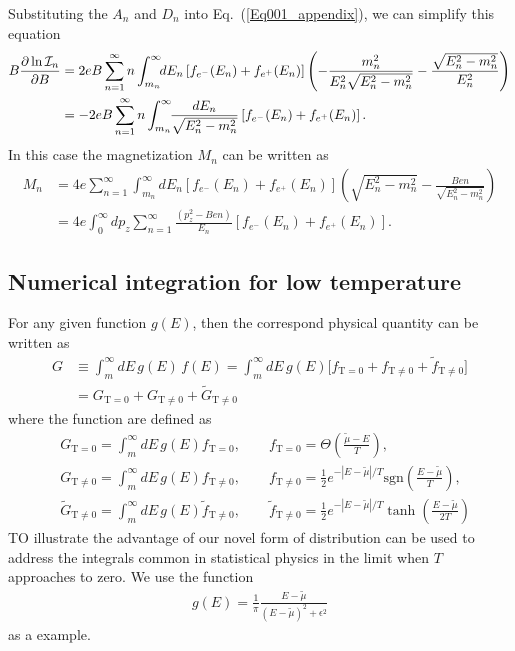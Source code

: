 \documentclass[sn-mathphys,Numbered]{sn-jnl}
\begin{document}
Substituting the $A_n$ and $D_n$ into Eq.~(\ref{Eq001_appendix}), we can simplify this equation 
\begin{align}
B\frac{\partial\ln\mathcal{I}_n}{\partial B}
&=2eB\sum_{n=1}^\infty n\int_{m_n}^\infty\!\!dE_n \left[f_{e^-}(E_n)+f_{e^+}(E_n)\right]\left(-\frac{m^2_n}{E^2_{n}\sqrt{E^2_n-m^2_n}}-\frac{\sqrt{E^2_n-m^2_n}}{E^2_{n}}\right)\notag\\
&=-2eB\sum_{n=1}^\infty n\int_{m_n}^\infty\!\!\frac{dE_n}{\sqrt{E^2_n-m^2_n}} \left[f_{e^-}(E_n)+f_{e^+}(E_n)\right].
\end{align}
In this case the magnetization $M_n$ can be written as
\begin{align}
M_n&=4e\sum_{n=1}^\infty \int_{m_n}^\infty\!\!dE_n\left[f_{e^-}(E_n)+f_{e^+}(E_n)\right]\left({\sqrt{E^2_n-m^2_n}}-\frac{Ben}{\sqrt{E^2_n-m^2_n}}\right)\\
&=4e \int_{0}^\infty\!\!dp_z\sum_{n=1}^\infty\frac{(p_z^2-Ben)}{E_n}\left[f_{e^-}(E_n)+f_{e^+}(E_n)\right].
\end{align}

\subsection{Numerical integration for low temperature}
For any given function $g(E)$, then the correspond physical quantity can be written as
\begin{align}
G&\equiv\int^{\infty}_{m}dE\,g(E)\,f(E)=\int^{\infty}_{m}dE\,g(E)\bigg[f_{\mathrm{T=0}}+f_\mathrm{T\neq0}+\tilde f_\mathrm{T\neq0}\bigg]\\
&=G_{\mathrm{T=0}}+G_\mathrm{T\neq0}+\tilde G_\mathrm{T\neq0}
\end{align}
where the function are defined as
\begin{align}
&G_{\mathrm{T=0}}=\int^{\infty}_{m}dE\,g(E)f_{\mathrm{T=0}},\qquad f_{\mathrm{T=0}}=\Theta\left(\frac{\widetilde\mu - E}{T}\right),\\ &G_{\mathrm{T\neq0}}=\int^{\infty}_{m}dE\,g(E)f_{\mathrm{T\neq0}},\qquad f_\mathrm{T\neq0}=\frac{1}{2}e^{ - |E-\widetilde\mu|/T }\mathrm{sgn}\left(\frac{E-\widetilde\mu}{T}\right),\\
&\tilde G_{\mathrm{T\neq0}}=\int^{\infty}_{m}dE\,g(E)\tilde f_{\mathrm{T\neq0}},\qquad\tilde f_\mathrm{T\neq0}=\frac{1}{2}e^{ - |E-\widetilde\mu|/T }\tanh\left(\frac{E-\widetilde\mu}{2T}\right)
\end{align}
TO illustrate the advantage of our novel form of distribution can be used to address the integrals common in statistical physics in the limit when $T$ approaches to zero. We use the function 
\begin{align}
    g(E)=\frac{1}{\pi} \frac{E-\tilde\mu}{(E-\tilde\mu)^2+\epsilon^2}
\end{align}
as a example. 
\end{document}
